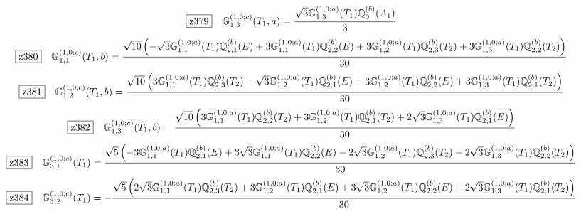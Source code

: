 \documentclass[fleqn,10pt,landscape]{jsarticle}
\begin{document}
\begin{dmath*}
\hspace*{3mm}\fbox{z379}\quad \mathbb{G}_{1,3}^{(1,0;c)}(T_{1},a)=\frac{\sqrt{3} \mathbb{G}_{1,3}^{(1,0;a)}(T_{1}) \mathbb{Q}_{0}^{(b)}(A_{1})}{3}
\end{dmath*}
\begin{dmath*}
\hspace*{3mm}\fbox{z380}\quad \mathbb{G}_{1,1}^{(1,0;c)}(T_{1},b)=\frac{\sqrt{10} \left(- \sqrt{3} \mathbb{G}_{1,1}^{(1,0;a)}(T_{1}) \mathbb{Q}_{2,1}^{(b)}(E) + 3 \mathbb{G}_{1,1}^{(1,0;a)}(T_{1}) \mathbb{Q}_{2,2}^{(b)}(E) + 3 \mathbb{G}_{1,2}^{(1,0;a)}(T_{1}) \mathbb{Q}_{2,3}^{(b)}(T_{2}) + 3 \mathbb{G}_{1,3}^{(1,0;a)}(T_{1}) \mathbb{Q}_{2,2}^{(b)}(T_{2})\right)}{30}
\end{dmath*}
\begin{dmath*}
\hspace*{3mm}\fbox{z381}\quad \mathbb{G}_{1,2}^{(1,0;c)}(T_{1},b)=\frac{\sqrt{10} \left(3 \mathbb{G}_{1,1}^{(1,0;a)}(T_{1}) \mathbb{Q}_{2,3}^{(b)}(T_{2}) - \sqrt{3} \mathbb{G}_{1,2}^{(1,0;a)}(T_{1}) \mathbb{Q}_{2,1}^{(b)}(E) - 3 \mathbb{G}_{1,2}^{(1,0;a)}(T_{1}) \mathbb{Q}_{2,2}^{(b)}(E) + 3 \mathbb{G}_{1,3}^{(1,0;a)}(T_{1}) \mathbb{Q}_{2,1}^{(b)}(T_{2})\right)}{30}
\end{dmath*}
\begin{dmath*}
\hspace*{3mm}\fbox{z382}\quad \mathbb{G}_{1,3}^{(1,0;c)}(T_{1},b)=\frac{\sqrt{10} \left(3 \mathbb{G}_{1,1}^{(1,0;a)}(T_{1}) \mathbb{Q}_{2,2}^{(b)}(T_{2}) + 3 \mathbb{G}_{1,2}^{(1,0;a)}(T_{1}) \mathbb{Q}_{2,1}^{(b)}(T_{2}) + 2 \sqrt{3} \mathbb{G}_{1,3}^{(1,0;a)}(T_{1}) \mathbb{Q}_{2,1}^{(b)}(E)\right)}{30}
\end{dmath*}
\begin{dmath*}
\hspace*{3mm}\fbox{z383}\quad \mathbb{G}_{3,1}^{(1,0;c)}(T_{1})=\frac{\sqrt{5} \left(- 3 \mathbb{G}_{1,1}^{(1,0;a)}(T_{1}) \mathbb{Q}_{2,1}^{(b)}(E) + 3 \sqrt{3} \mathbb{G}_{1,1}^{(1,0;a)}(T_{1}) \mathbb{Q}_{2,2}^{(b)}(E) - 2 \sqrt{3} \mathbb{G}_{1,2}^{(1,0;a)}(T_{1}) \mathbb{Q}_{2,3}^{(b)}(T_{2}) - 2 \sqrt{3} \mathbb{G}_{1,3}^{(1,0;a)}(T_{1}) \mathbb{Q}_{2,2}^{(b)}(T_{2})\right)}{30}
\end{dmath*}
\begin{dmath*}
\hspace*{3mm}\fbox{z384}\quad \mathbb{G}_{3,2}^{(1,0;c)}(T_{1})=- \frac{\sqrt{5} \left(2 \sqrt{3} \mathbb{G}_{1,1}^{(1,0;a)}(T_{1}) \mathbb{Q}_{2,3}^{(b)}(T_{2}) + 3 \mathbb{G}_{1,2}^{(1,0;a)}(T_{1}) \mathbb{Q}_{2,1}^{(b)}(E) + 3 \sqrt{3} \mathbb{G}_{1,2}^{(1,0;a)}(T_{1}) \mathbb{Q}_{2,2}^{(b)}(E) + 2 \sqrt{3} \mathbb{G}_{1,3}^{(1,0;a)}(T_{1}) \mathbb{Q}_{2,1}^{(b)}(T_{2})\right)}{30}
\end{dmath*}
\end{document}
